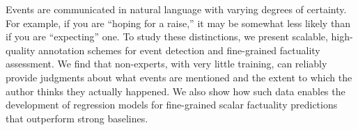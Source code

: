 Events are communicated in natural language with varying degrees of certainty. For example, if you are ``hoping for a raise,'' it may be somewhat less likely than if you are ``expecting'' one. To study these distinctions, we present scalable, high-quality annotation schemes for event detection and fine-grained factuality assessment. We find that non-experts, with very little training, can reliably provide judgments about what events are mentioned and the extent to which the author thinks they actually happened. We also show how such data enables the development of regression models for fine-grained scalar factuality predictions that outperform strong baselines.
